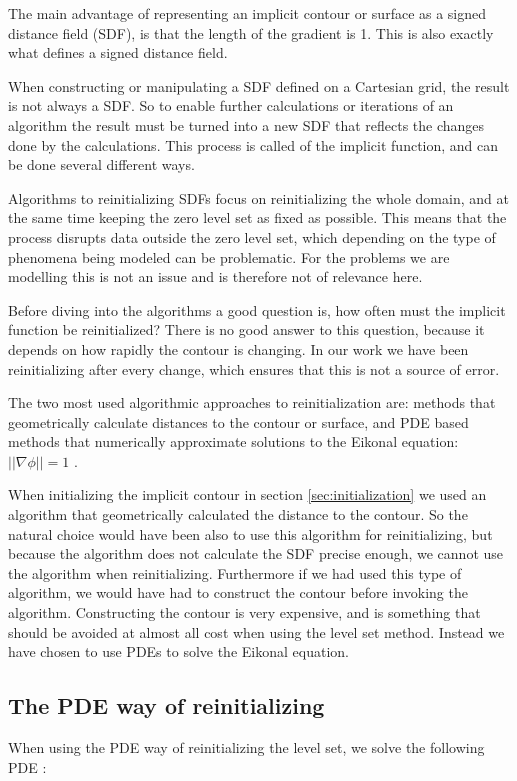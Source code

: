 
The main advantage of representing an implicit contour or surface as
a signed distance field (SDF), is that the length of the gradient is
1. This is also exactly what defines a signed distance field.

When constructing or manipulating a SDF defined on a Cartesian grid,
the result is not always a SDF. So to enable further calculations or
iterations of an algorithm the result must be turned into a new SDF
that reflects the changes done by the calculations. This process is
called  of the implicit function, and can be
done several different ways.

Algorithms to reinitializing SDFs focus on reinitializing the whole
domain, and at the same time keeping the zero level set as fixed as
possible. This means that the process disrupts data outside the zero
level set, which depending on the type of phenomena being modeled
can be problematic. For the problems we are modelling this is not an
issue and is therefore not of relevance here.

Before diving into the algorithms a good question is, how often must the
implicit function be reinitialized? There is no good answer to this
question, because it depends on how rapidly the contour is
changing. In our work we have been reinitializing after every change,
which ensures that this is not a source of error.

The two most used algorithmic approaches to reinitialization are:
methods that geometrically calculate distances to the contour or surface,
and PDE based methods that numerically approximate solutions to the
Eikonal equation: $||\nabla \phi|| = 1$
.

When initializing the implicit contour in section \vref{sec:initialization}
we used an algorithm that geometrically calculated the distance to the
contour. So the natural choice would have been also to use this algorithm for
reinitializing, but because the algorithm does not calculate the
SDF precise enough, we cannot use the algorithm
when reinitializing. Furthermore if we had used this type of
algorithm, we would have had to construct the contour before
invoking the algorithm. Constructing the contour is very expensive,
and is something that should be avoided at almost all cost when using
the level set method. Instead we have chosen to use PDEs to solve the
Eikonal equation.

\subsection{The PDE way of reinitializing}
When using the PDE way of reinitializing the level set, we solve the
following PDE :

